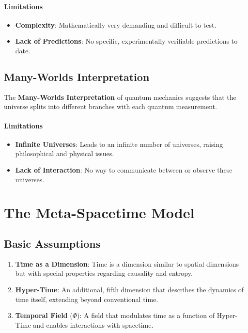 \documentclass[11pt,a4paper]{article}
\begin{document}
\paragraph{Limitations}

\begin{itemize}
    \item \textbf{Complexity}: Mathematically very demanding and difficult to test.
    \item \textbf{Lack of Predictions}: No specific, experimentally verifiable predictions to date.
\end{itemize}

\subsection{Many-Worlds Interpretation}

The \textbf{Many-Worlds Interpretation} of quantum mechanics suggests that the universe splits into different branches with each quantum measurement.

\paragraph{Limitations}

\begin{itemize}
    \item \textbf{Infinite Universes}: Leads to an infinite number of universes, raising philosophical and physical issues.
    \item \textbf{Lack of Interaction}: No way to communicate between or observe these universes.
\end{itemize}

\section{The Meta-Spacetime Model}

\subsection{Basic Assumptions}

\begin{enumerate}
    \item \textbf{Time as a Dimension}: Time is a dimension similar to spatial dimensions but with special properties regarding causality and entropy.
    \item \textbf{Hyper-Time}: An additional, fifth dimension that describes the dynamics of time itself, extending beyond conventional time.
    \item \textbf{Temporal Field} ($\Phi$): A field that modulates time as a function of Hyper-Time and enables interactions with spacetime.
\end{enumerate}
\end{document}
